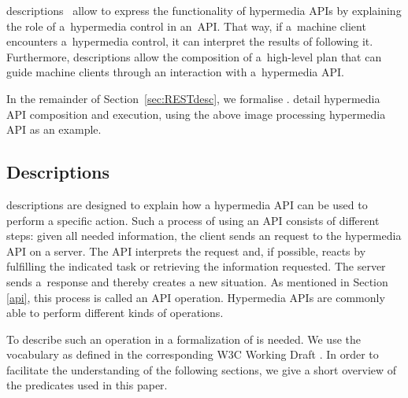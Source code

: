 \restdesc descriptions~\cite{verborgh_wsrest_2012,verborgh_mtap_2013}
allow to express the functionality of hypermedia APIs
by explaining the role of a~hypermedia control in an~API.
That way, if a~machine client encounters a~hypermedia control,
it can interpret the results of following it.
Furthermore, \restdesc descriptions allow the composition of a~high-level plan
that can guide machine clients through an interaction with a~hypermedia API.

In the remainder of Section~\ref{sec:RESTdesc},
we formalise \restdesc.
 detail hypermedia API composition and execution,
using the above image processing hypermedia API as an example.




\subsection{\restdesc Descriptions}\label{rd}

\restdesc descriptions are designed to explain how a hypermedia API can be used to perform a specific action. 
Such a process of using an API consists of different steps:
given all needed information, the client sends an \http request to the hypermedia API on a server.
The API interprets the request and,
if possible, reacts by fulfilling the indicated task
or retrieving the information requested. The server sends a~response and thereby creates a new situation. As mentioned in Section \ref{api}, this process 
is called an API operation.
Hypermedia APIs are commonly able to perform different kinds of operations.

To describe such an operation in \nthree
a formalization of \http
is needed. 
We use the \rdf vocabulary as defined in the corresponding W3C Working Draft \cite{httprdf}.
In order to facilitate the understanding of the following sections, we give a short overview of the \http predicates used in this paper.

